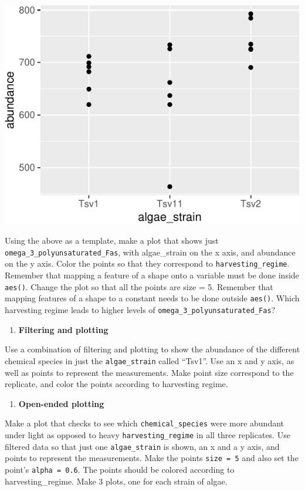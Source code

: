 \documentclass[
]{krantz}
\providecommand{\tightlist}{%
  \setlength{\itemsep}{0pt}\setlength{\parskip}{0pt}}
\begin{document}
\begin{center}\includegraphics[width=0.8\linewidth]{index_files/figure-latex/unnamed-chunk-36-1} \end{center}

Using the above as a template, make a plot that shows just \texttt{omega\_3\_polyunsaturated\_Fas}, with algae\_strain on the x axis, and abundance on the y axis. Color the points so that they correspond to \texttt{harvesting\_regime}. Remember that mapping a feature of a shape onto a variable must be done inside \texttt{aes()}. Change the plot so that all the points are size = 5. Remember that mapping features of a shape to a constant needs to be done outside \texttt{aes()}. Which harvesting regime leads to higher levels of \texttt{omega\_3\_polyunsaturated\_Fas}?

\begin{enumerate}
\def\labelenumi{\arabic{enumi}.}
\setcounter{enumi}{6}
\tightlist
\item
  \textbf{Filtering and plotting}
\end{enumerate}

Use a combination of filtering and plotting to show the abundance of the different chemical species in just the \texttt{algae\_strain} called ``Tsv1''. Use an x and y axis, as well as points to represent the measurements. Make point size correspond to the replicate, and color the points according to harvesting regime.

\begin{enumerate}
\def\labelenumi{\arabic{enumi}.}
\setcounter{enumi}{7}
\tightlist
\item
  \textbf{Open-ended plotting}
\end{enumerate}

Make a plot that checks to see which \texttt{chemical\_species} were more abundant under light as opposed to heavy \texttt{harvesting\_regime} in all three replicates. Use filtered data so that just one \texttt{algae\_strain} is shown, an x and a y axis, and points to represent the measurements. Make the points \texttt{size\ =\ 5} and also set the point's \texttt{alpha\ =\ 0.6}. The points should be colored according to harvesting\_regime. Make 3 plots, one for each strain of algae.
\end{document}
